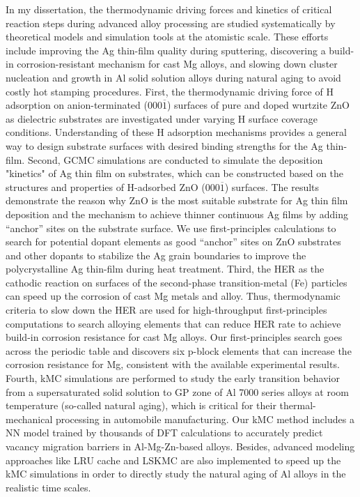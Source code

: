 
In my dissertation, the thermodynamic driving forces and kinetics of critical reaction steps during advanced alloy processing are studied systematically by theoretical models and simulation tools at the atomistic scale. These efforts include improving the Ag thin-film quality during sputtering, discovering a build-in corrosion-resistant mechanism for cast Mg alloys, and slowing down cluster nucleation and growth in Al solid solution alloys during natural aging to avoid costly hot stamping procedures. First, the thermodynamic driving force of H adsorption on anion-terminated (000$\overline{1}$) surfaces of pure and doped wurtzite ZnO as dielectric substrates are investigated under varying H surface coverage conditions. Understanding of these H adsorption mechanisms provides a general way to design substrate surfaces with desired binding strengths for the Ag thin-film. Second, \acf{GCMC} simulations are conducted to simulate the deposition "kinetics" of Ag thin film on substrates, which can be constructed based on the structures and properties of H-adsorbed ZnO (000$\overline{1}$) surfaces. The results demonstrate the reason why ZnO is the most suitable substrate for Ag thin film deposition and the mechanism to achieve thinner continuous Ag films by adding ``anchor'' sites on the substrate surface. We use first-principles calculations to search for potential dopant elements as good ``anchor'' sites on ZnO substrates and other dopants to stabilize the Ag grain boundaries to improve the polycrystalline Ag thin-film during heat treatment. Third, the \acf{HER} as the cathodic reaction on surfaces of the second-phase transition-metal (Fe) particles can speed up the corrosion of cast Mg metals and alloy. Thus, thermodynamic criteria to slow down the HER are used for high-throughput first-principles computations to search alloying elements that can reduce HER rate to achieve build-in corrosion resistance for cast Mg alloys. Our first-principles search goes across the periodic table and discovers six p-block elements that can increase the corrosion resistance for Mg, consistent with the available experimental results. Fourth, \acf{kMC} simulations are performed to study the early transition behavior from a supersaturated solid solution to \acf{GP} zone of Al 7000 series alloys at room temperature (so-called natural aging), which is critical for their thermal-mechanical processing in automobile manufacturing. Our \ac{kMC} method includes a \acf{NN} model trained by thousands of \ac{DFT} calculations to accurately predict vacancy migration barriers in Al-Mg-Zn-based alloys. Besides, advanced modeling approaches like \acf{LRU} cache and \acf{LSKMC} are also implemented to speed up the \ac{kMC} simulations in order to directly study the natural aging of Al alloys in the realistic time scales.
